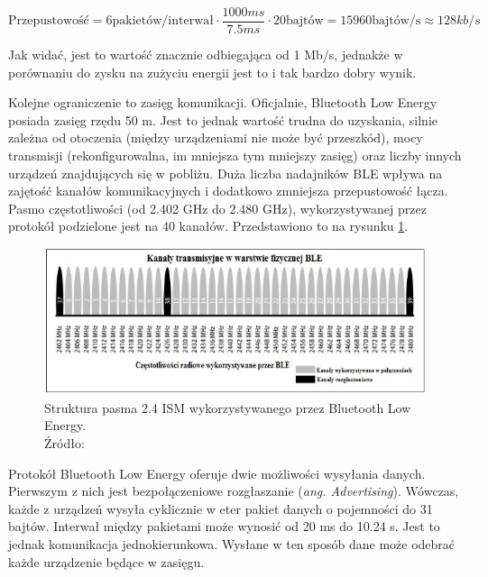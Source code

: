 \begin{equation}
	\text{Przepustowość} = 6 \text{pakietów/interwał} \cdot \frac{1000ms}{7.5ms} \cdot 20 \text{bajtów} = 15960 \text{bajtów/s} \approx 128 kb/s
\end{equation}

Jak widać, jest to wartość znacznie odbiegająca od 1 Mb/s, jednakże w porównaniu do zysku na zużyciu energii jest to i tak bardzo dobry wynik. 

Kolejne ograniczenie to zasięg komunikacji. Oficjalnie, Bluetooth Low Energy posiada zasięg rzędu 50 m. Jest to jednak wartość trudna do uzyskania, silnie zależna od otoczenia (między urządzeniami nie może być przeszkód), mocy transmisji (rekonfigurowalna, im mniejsza tym mniejszy zasięg) oraz liczby innych urządzeń znajdujących się w pobliżu. Duża liczba nadajników BLE wpływa na zajętość kanałów komunikacyjnych i dodatkowo zmniejsza przepustowość łącza. Pasmo częstotliwości (od 2.402 GHz do 2.480 GHz), wykorzystywanej przez protokół podzielone jest na 40 kanałów. Przedstawiono to na rysunku \ref{fig:image_ble_channels}.

\begin{figure}[H]
	\centering
	\includegraphics[width=17cm]{img/theory/BLE/ble_channels.png}
	\caption{Struktura pasma 2.4 ISM wykorzystywanego przez Bluetooth Low Energy.\\Źródło: \cite{inzynierka}}
	\label{fig:image_ble_channels}
\end{figure}

Protokół Bluetooth Low Energy oferuje dwie możliwości wysyłania danych. Pierwszym z nich jest bezpołączeniowe rozgłaszanie (\textit{ang. Advertising}). Wówczas, każde z urządzeń wysyła cyklicznie  w eter pakiet danych o pojemności do 31 bajtów. Interwał między pakietami może wynosić od 20 ms do 10.24 s. Jest to jednak komunikacja jednokierunkowa. Wysłane w ten sposób dane może odebrać każde urządzenie będące w zasięgu.

